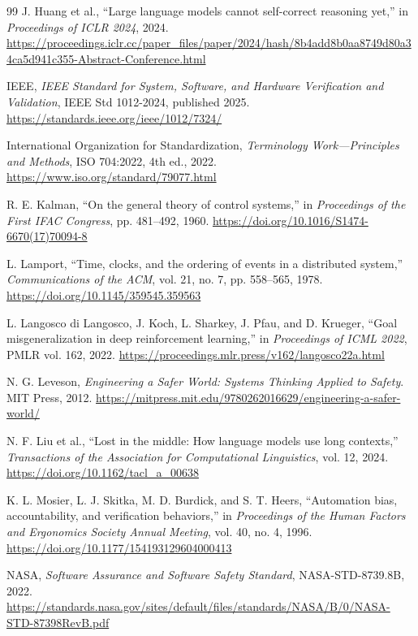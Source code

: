 \documentclass[10pt,a4paper]{article}
\begin{document}
\begin{thebibliography}{99}
J. Huang et al., ``Large language models cannot self-correct reasoning yet,'' in \emph{Proceedings of ICLR 2024}, 2024. \url{https://proceedings.iclr.cc/paper_files/paper/2024/hash/8b4add8b0aa8749d80a34ca5d941c355-Abstract-Conference.html}

IEEE, \emph{IEEE Standard for System, Software, and Hardware Verification and Validation}, IEEE Std 1012-2024, published 2025. \url{https://standards.ieee.org/ieee/1012/7324/}

International Organization for Standardization, \emph{Terminology Work---Principles and Methods}, ISO 704:2022, 4th ed., 2022. \url{https://www.iso.org/standard/79077.html}

R. E. Kalman, ``On the general theory of control systems,'' in \emph{Proceedings of the First IFAC Congress}, pp. 481--492, 1960. \url{https://doi.org/10.1016/S1474-6670(17)70094-8}

L. Lamport, ``Time, clocks, and the ordering of events in a distributed system,'' \emph{Communications of the ACM}, vol. 21, no. 7, pp. 558--565, 1978. \url{https://doi.org/10.1145/359545.359563}

L. Langosco di Langosco, J. Koch, L. Sharkey, J. Pfau, and D. Krueger, ``Goal misgeneralization in deep reinforcement learning,'' in \emph{Proceedings of ICML 2022}, PMLR vol. 162, 2022. \url{https://proceedings.mlr.press/v162/langosco22a.html}

N. G. Leveson, \emph{Engineering a Safer World: Systems Thinking Applied to Safety}. MIT Press, 2012. \url{https://mitpress.mit.edu/9780262016629/engineering-a-safer-world/}

N. F. Liu et al., ``Lost in the middle: How language models use long contexts,'' \emph{Transactions of the Association for Computational Linguistics}, vol. 12, 2024. \url{https://doi.org/10.1162/tacl_a_00638}

K. L. Mosier, L. J. Skitka, M. D. Burdick, and S. T. Heers, ``Automation bias, accountability, and verification behaviors,'' in \emph{Proceedings of the Human Factors and Ergonomics Society Annual Meeting}, vol. 40, no. 4, 1996. \url{https://doi.org/10.1177/154193129604000413}

NASA, \emph{Software Assurance and Software Safety Standard}, NASA-STD-8739.8B, 2022. \url{https://standards.nasa.gov/sites/default/files/standards/NASA/B/0/NASA-STD-87398RevB.pdf}


\end{thebibliography}
\end{document}
